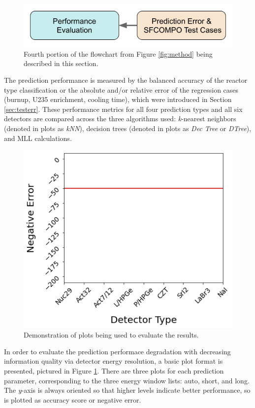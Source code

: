

\begin{figure}[H]
  \centering
  \includegraphics[width=0.7\linewidth]{./chapters/exp1/methodology4.png}
  \caption{Fourth portion of the flowchart from Figure \ref{fig:method} being 
           described in this section.}
\end{figure}


The prediction performance is measured by the balanced accuracy of the reactor
type classification or the absolute and/or relative error of the regression
cases (burnup, \gls{U235} enrichment, cooling time), which were introduced in
Section \ref{sec:testerr}.  These performance metrics for all four prediction
types and all six detectors are compared across the three algorithms used:
\textit{k}-nearest neighbors (denoted in plots as \textit{kNN}), decision trees
(denoted in plots as \textit{Dec Tree} or \textit{DTree}), and \gls{MLL}
calculations.  

\begin{figure}[!htb]
  \centering
  \includegraphics[width=0.5\linewidth]{./chapters/exp2/exp2_plot_description.png}
  \caption{Demonstration of plots being used to evaluate the results.}
  \label{fig:detdemo}
\end{figure}

In order to evaluate the prediction performace degradation with decreasing
information quality via detector energy resolution, a basic plot format is
presented, pictured in Figure \ref{fig:detdemo}.  There are three plots for
each prediction parameter, corresponding to the three energy window lists:
auto, short, and long.  The \textit{y}-axis is always oriented so that higher
levels indicate better performance, so is plotted as accuracy score or negative
error.  

